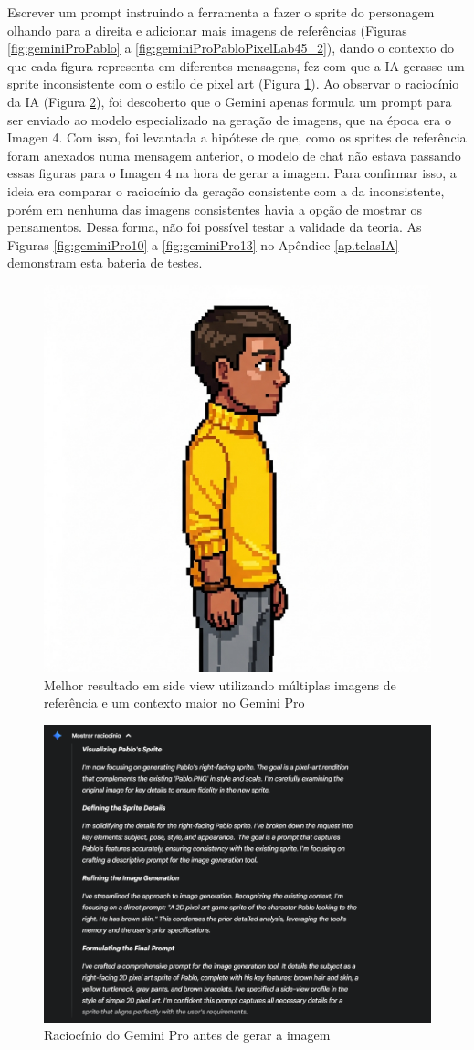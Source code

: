 Escrever um prompt instruindo a ferramenta a fazer o sprite do personagem olhando para a direita e adicionar mais imagens de referências (Figuras \ref{fig:geminiProPablo} a \ref{fig:geminiProPabloPixelLab45_2}), dando o contexto do que cada figura representa em diferentes mensagens, fez com que a IA gerasse um sprite inconsistente com o estilo de pixel art (Figura \ref{fig:GeminiProInconsistenteMelhor}). Ao observar o raciocínio da IA (Figura \ref{fig:GeminiProRaciocinioGeracaoImagem}), foi descoberto que o Gemini apenas formula um prompt para ser enviado ao modelo especializado na geração de imagens, que na época era o Imagen 4. Com isso, foi levantada a hipótese de que, como os sprites de referência foram anexados numa mensagem anterior, o modelo de chat não estava passando essas figuras para o Imagen 4 na hora de gerar a imagem. Para confirmar isso, a ideia era comparar o raciocínio da geração consistente com a da inconsistente, porém em nenhuma das imagens consistentes havia a opção de mostrar os pensamentos. Dessa forma, não foi possível testar a validade da teoria. As Figuras \ref{fig:geminiPro10} a \ref{fig:geminiPro13} no Apêndice \ref{ap.telasIA} demonstram esta bateria de testes.

\begin{figure}[htbp]
    \centering
    \caption{\small Melhor resultado em side view utilizando múltiplas imagens de referência e um contexto maior no Gemini Pro}
    \label{fig:GeminiProInconsistenteMelhor}
    \includegraphics[width=0.2\linewidth]{figs/geminiPro/chat4/res1_tela16.png}
\end{figure}

\begin{figure}[htbp]
    \centering
    \caption{\small Raciocínio do Gemini Pro antes de gerar a imagem}
    \label{fig:GeminiProRaciocinioGeracaoImagem}
    \includegraphics[width=0.8\linewidth]{figs/geminiPro/chat4/tela5.PNG}
\end{figure}


